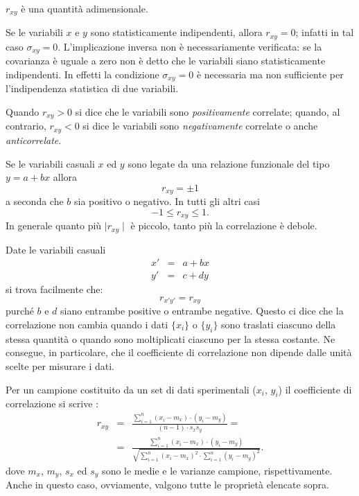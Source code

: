 \begin{numlist}
\item {
$r_{xy}$ \`e una quantit\`a adimensionale.
}
\item{
Se le variabili $x$ e $y$ sono statisticamente indipendenti, allora
$r_{xy} = 0$; infatti in tal caso $\sigma_{xy}=0$.
L'implicazione inversa non \`e necessariamente
verificata: se la covarianza \`e uguale a zero non \`e detto che
le variabili siano statisticamente indipendenti.
In effetti la condizione $\sigma_{xy}=0$ \`e necessaria ma
non sufficiente per l'indipendenza statistica di due variabili.
}
\item{
Quando $r_{xy}> 0$ si dice che le variabili sono {\itshape positivamente}
correlate; quando, al contrario, $r_{xy}< 0$ si dice le variabili sono
{\itshape negativamente} correlate o anche {\itshape anticorrelate}.
}
\item{\label{oss:Correlazione1}
Se le variabili casuali $x$ ed $y$ sono legate da una relazione funzionale del
tipo $y=a+b x$ allora
$$
r_{xy}=\pm 1
$$
a seconda che $b$ sia positivo
o negativo. In tutti gli altri casi
$$
-1 \le r_{xy} \le 1.
$$
In generale quanto pi\`u $\mid r_{xy}\mid$ \`e piccolo, tanto pi\`u la
correlazione \`e debole.
}
\item{\label{oss:Correlazione2}
Date le variabili casuali
\begin{eqnarray*}
x'&=&a+b x\\
y'&=&c+dy
\end{eqnarray*}
si trova facilmente che:
$$
r_{x'y'} = r_{xy}
$$
purch\'e $b$ e $d$ siano entrambe positive o entrambe negative.
Questo ci dice che la correlazione non cambia quando i dati $\{x_i\}$  o
$\{y_i\}$ sono traslati ciascuno della stessa quantit\`a o quando sono
moltiplicati ciascuno per la stessa costante. Ne consegue, in particolare, che
il coefficiente di correlazione non dipende dalle unit\`a scelte per misurare i
dati.
}
\end{numlist}

Per un campione costituito da un set di dati sperimentali ($x_i$, $y_i$) il
coefficiente di correlazione si scrive :
\begin{eqnarray}\label{eq:CoeffCorrelazioneDati}
r_{xy} &=&
\frac{\displaystyle \sum_{i=1}^n(x_i-m_{x})
\cdot (y_i-m_{y})}{(n-1)\cdot s_x s_y}= \nonumber \\
&=&\frac{\displaystyle \sum_{i=1}^n(x_i-m_{x}) \cdot (y_i-m_{y})}
{\sqrt{\displaystyle \sum_{i=1}^n(x_i-m_{x})^2
\cdot \sum_{i=1}^n(y_i-m_{y})^2}}.
\end{eqnarray}
dove $m_x$, $m_y$, $s_x$ ed $s_y$ sono le medie e le varianze campione,
rispettivamente.
Anche in questo caso, ovviamente, valgono tutte le propriet\`a
elencate sopra.


